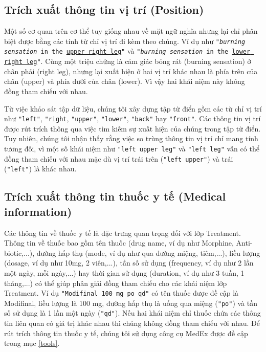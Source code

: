 \subsection*{Trích xuất thông tin vị trí (Position)}
Một số cơ quan trên cơ thể tuy giống nhau về mặt ngữ nghĩa nhưng lại chỉ phân biệt được bằng các tính từ chỉ vị trí đi kèm theo chúng. Ví dụ như \texttt{"\textsl{burning sensation} in the \underline{upper right leg}"} và \texttt{"\textsl{burning sensation} in the \underline{lower right leg}"}. Cùng một triệu chứng là cảm giác bỏng rát (burning sensation) ở chân phải (right leg), nhưng lại xuất hiện ở hai vị trí khác nhau là phía trên của chân (upper) và phía dưới của chân (lower). Vì vậy hai khái niệm này không đồng tham chiếu với nhau.

Từ việc khảo sát tập dữ liệu, chúng tôi xây dựng tập từ điển gồm các từ chỉ vị trí như \texttt{"left"}, \texttt{"right}, \texttt{"upper"}, \texttt{"lower"}, \texttt{"back"} hay \texttt{"front"}. Các thông tin vị trí được rút trích thông qua việc tìm kiếm sự xuất hiện của chúng trong tập từ điển. Tuy nhiên, chúng tôi nhận thấy rằng việc so trùng thông tin vị trí chỉ mang tính tương đối, vì một số khái niệm như \texttt{"left upper leg"} và \texttt{"left leg"} vẫn có thể đồng tham chiếu với nhau mặc dù vị trí trái trên (\texttt{"left upper"}) và trái (\texttt{"left"}) là khác nhau.

\subsection*{Trích xuất thông tin thuốc y tế (Medical information)}
Các thông tin về thuốc y tế là đặc trưng quan trọng đối với lớp Treatment. Thông tin về thuốc bao gồm tên thuốc (drug name, ví dụ như Morphine, Anti-biotic,...), đường hấp thụ (mode, ví dụ như qua đường miệng, tiêm,...), liều lượng (dosage, ví dụ như 10mg, 2 viên,...), tần số sử dụng (frequency, ví dụ như 2 lần một ngày, mỗi ngày,...) hay thời gian sử dụng (duration, ví dụ như 3 tuần, 1 tháng,...) có thể giúp phân giải đồng tham chiếu cho các khái niệm lớp Treatment. Ví dụ \texttt{"Modifinal 100 mg po qd"} có tên thuốc được đề cập là Modifinal, liều lượng là 100 mg, đường hấp thụ là uống qua miệng (\texttt{"po"}) và tần số sử dụng là 1 lần một ngày (\texttt{"qd"}). Nếu hai khái niệm chỉ thuốc chứa các thông tin liên quan có giá trị khác nhau thì chúng không đồng tham chiếu với nhau. Để rút trích thông tin thuốc y tế, chúng tôi sử dụng công cụ MedEx được đề cập trong mục \ref{tools}.

